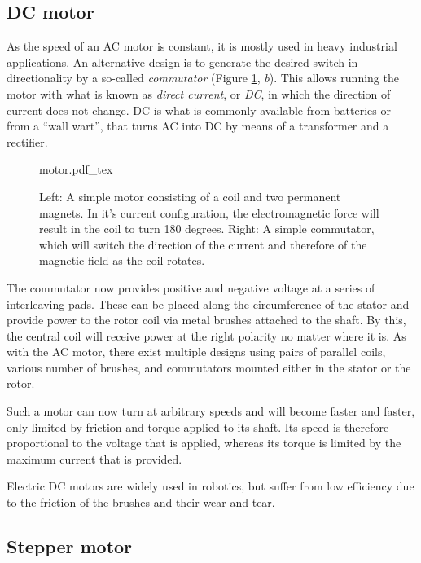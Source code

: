 \subsection{DC motor}

As the speed of an AC motor is constant, it is mostly used in heavy industrial applications. An alternative design is to generate the desired switch in directionality by a so-called \textsl{commutator} (Figure \ref{fig:motor}, \emph{b}). This allows running the motor with what is known as \textsl{direct current}, or \textsl{DC}, in which the direction of current does not change. DC is what is commonly available from batteries or from a ``wall wart'', that turns AC into DC by means of a transformer and a rectifier.

\begin{figure}
\centering
    \def\svgwidth{\textwidth}
    {motor.pdf_tex}
    \caption{Left: A simple motor consisting of a coil and two permanent magnets. In it's current configuration, the electromagnetic force will result in the coil to turn 180 degrees. Right: A simple commutator, which will switch the direction of the current and therefore of the magnetic field as the coil rotates.}\label{fig:motor}
\end{figure}

The commutator now provides positive and negative voltage at a series of interleaving pads. These can be placed along the circumference of the stator and provide power to the rotor coil via metal brushes attached to the shaft. By this, the central coil will receive power at the right polarity no matter where it is. As with the AC motor, there exist multiple designs using pairs of parallel coils, various number of brushes, and commutators mounted either in the stator or the rotor.

Such a motor can now turn at arbitrary speeds and will become faster and faster, only limited by friction and torque applied to its shaft. Its speed is therefore proportional to the voltage that is applied, whereas its torque is limited by the maximum current that is provided.

Electric DC motors are widely used in robotics, but suffer from low efficiency due to the friction of the brushes and their wear-and-tear.

\subsection{Stepper motor}

